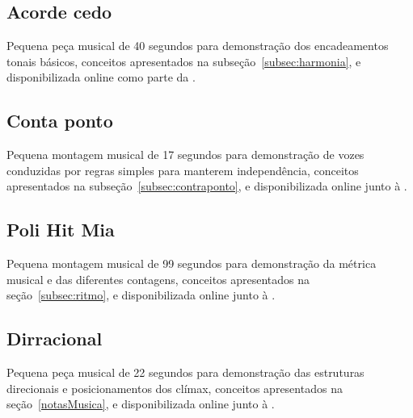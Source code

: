 \clearpage

\subsection{Acorde cedo}\label{ap:acorde}
Pequena peça musical de 40 segundos para demonstração dos encadeamentos tonais básicos, conceitos apresentados na subseção~\ref{subsec:harmonia}, e disponibilizada online como parte da \massa.\cite{MASSA}


\subsection{Conta ponto}\label{ap:conta}
Pequena montagem musical de 17 segundos para demonstração de vozes conduzidas por regras simples para manterem independência, conceitos apresentados na subseção~\ref{subsec:contraponto}, e disponibilizada online junto à \massa.\cite{MASSA}




\subsection{Poli Hit Mia}\label{ap:poli}
Pequena montagem musical de 99 segundos para demonstração da métrica musical e das diferentes contagens, conceitos apresentados na seção~\ref{subsec:ritmo}, e disponibilizada online junto à \massa.\cite{MASSA}



\subsection{Dirracional}\label{ap:dirracional}
Pequena peça musical de 22 segundos para demonstração das estruturas direcionais e posicionamentos dos clímax, conceitos apresentados na seção~\ref{notasMusica}, e disponibilizada online junto à \massa.\cite{MASSA}


